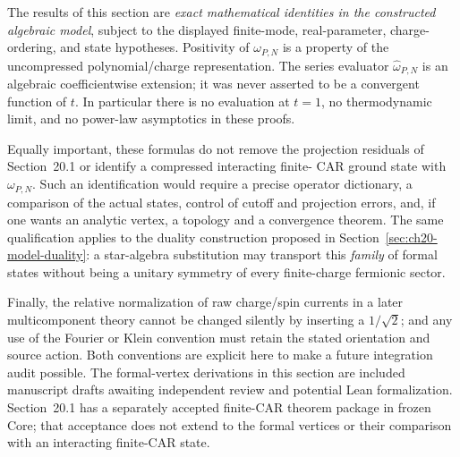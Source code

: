 The results of this section are \emph{exact mathematical identities in
the constructed algebraic model}, subject to the displayed finite-mode,
real-parameter, charge-ordering, and state hypotheses.  Positivity of
\(\omega_{P,N}\) is a property of the uncompressed polynomial/charge
representation.  The series evaluator \(\widehat\omega_{P,N}\) is an
algebraic coefficientwise extension; it was never asserted to be a
convergent function of \(t\).  In particular there is no evaluation at
\(t=1\), no thermodynamic limit, and no power-law asymptotics in these
proofs.

Equally important, these formulas do not remove the projection
residuals of Section~20.1 or identify a compressed interacting finite-
CAR ground state with \(\omega_{P,N}\).  Such an identification would
require a precise operator dictionary, a comparison of the actual
states, control of cutoff and projection errors, and, if one wants an
analytic vertex, a topology and a convergence theorem.  The same
qualification applies to the duality construction proposed in
Section~\ref{sec:ch20-model-duality}: a star-algebra substitution may
transport this \emph{family} of formal states without being a unitary
symmetry of every finite-charge fermionic sector.

Finally, the relative normalization of raw charge/spin currents in a
later multicomponent theory cannot be changed silently by inserting a
\(1/\sqrt2\); and any use of the Fourier or Klein convention must
retain the stated orientation and source action.  Both conventions are
explicit here to make a future integration audit possible.  The formal-vertex
derivations in this section are included manuscript drafts awaiting independent
review and potential Lean formalization.  Section~20.1 has a separately accepted
finite-CAR theorem package in frozen Core; that acceptance does not extend to
the formal vertices or their comparison with an interacting finite-CAR state.
